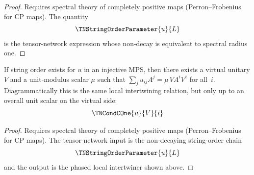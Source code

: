 \begin{proof}
    \notready
    Requires spectral theory of completely positive maps
    (Perron--Frobenius for CP maps).  The quantity
    \[
        \TNStringOrderParameter{u}{L}
    \]
    is the tensor-network expression whose non-decay is equivalent to spectral
    radius one.
\end{proof}

\begin{theorem}%
    \label{thm:virtual_unitary_of_string_order}
    \notready
    If string order exists for $u$ in an injective MPS, then there
    exists a virtual unitary $V$ and a unit-modulus scalar $\mu$
    such that $\sum_j u_{ij} A^j = \mu\, V A^i V^\dagger$ for all~$i$.
    Diagrammatically this is the same local intertwining relation,
    but only up to an overall unit scalar on the virtual side:
    \[
        \TNCondCOne{u}{V}{i}
    \]
\end{theorem}

\begin{proof}
    \notready
    Requires spectral theory of completely positive maps
    (Perron--Frobenius for CP maps).  The tensor-network input is the
    non-decaying string-order chain
    \[
        \TNStringOrderParameter{u}{L}
    \]
    and the output is the phased local intertwiner shown above.
\end{proof}
